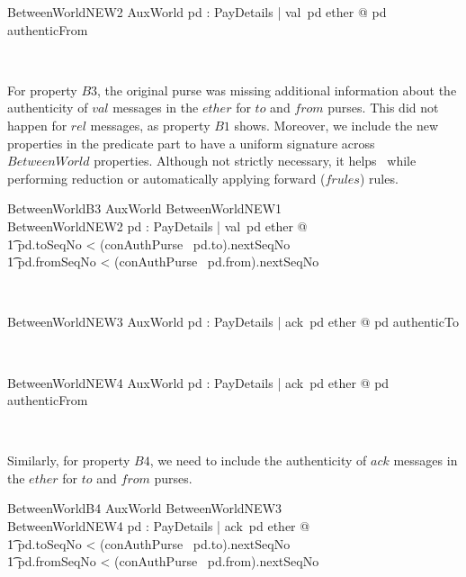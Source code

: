 \begin{LNewSDef}
\begin{schema}{BetweenWorldNEW2}
   AuxWorld
\where
   \forall pd : PayDetails | val~pd \in ether @ pd \in authenticFrom
\end{schema}~\end{LNewSDef}

For property $B3$, the original purse was missing additional information about the
authenticity of $val$ messages in the $ether$ for $to$ and $from$ purses. This did
not happen for $rel$ messages, as property $B1$ shows.
Moreover, we include the new properties in the predicate part to have a uniform signature
across  $BetweenWorld$ properties. Although not strictly necessary, it helps \zeves\ while
performing reduction or automatically applying forward ($frules$) rules.
%
\begin{LNewSDef}
\begin{schema}{BetweenWorldB3}
   AuxWorld
\where
   BetweenWorldNEW1 \\
   BetweenWorldNEW2
   \also
   \forall pd : PayDetails | val~pd \in ether @
  \\ %
  \t1 pd.toSeqNo < (conAuthPurse~ pd.to).nextSeqNo
  \\ %
  \t1 \land pd.fromSeqNo < (conAuthPurse~ pd.from).nextSeqNo
\end{schema}~\end{LNewSDef}

\begin{LNewSDef}
\begin{schema}{BetweenWorldNEW3}
   AuxWorld
\where
   \forall pd : PayDetails | ack~pd \in ether @ pd \in authenticTo
\end{schema}~\end{LNewSDef}

\begin{LNewSDef}
\begin{schema}{BetweenWorldNEW4}
   AuxWorld
\where
   \forall pd : PayDetails | ack~pd \in ether @ pd \in authenticFrom
\end{schema}~\end{LNewSDef}

Similarly, for property $B4$, we need to include the authenticity of
$ack$ messages in the $ether$ for $to$ and $from$ purses.
%
\begin{LNewSDef}
\begin{schema}{BetweenWorldB4}
   AuxWorld
\where
   BetweenWorldNEW3 \\
   BetweenWorldNEW4
   \also
   \forall pd : PayDetails | ack~pd \in ether @
  \\ %
  \t1 pd.toSeqNo < (conAuthPurse~ pd.to).nextSeqNo
  \\ %
  \t1 \land pd.fromSeqNo < (conAuthPurse~ pd.from).nextSeqNo
\end{schema}~\end{LNewSDef}

